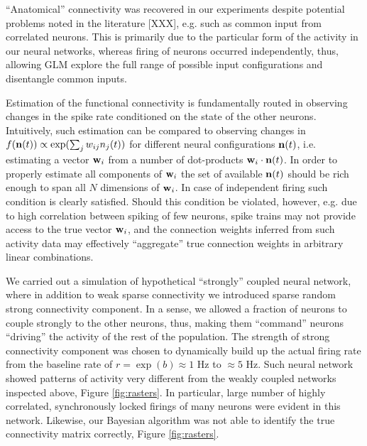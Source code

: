 ``Anatomical'' connectivity was recovered in our experiments despite potential problems noted in the literature [XXX], e.g. such as common input from correlated neurons. This is primarily due to the particular form of the activity in our neural networks, whereas firing of neurons occurred independently, thus, allowing GLM explore the full range of possible input configurations and disentangle common inputs.

Estimation of the functional connectivity is fundamentally routed in observing changes in the spike rate conditioned on the state of the other neurons. Intuitively, such estimation can be compared to observing changes in $f({\bf n}(t))\propto\exp(\sum_j w_{ij}n_j(t))$ for different neural configurations ${\bf n}(t)$, i.e. estimating a vector ${\bf w}_i$ from a number of dot-products ${\bf w}_i\cdot {\bf n}(t)$. In order to properly estimate all components of ${\bf w}_i$ the set of available ${\bf n}(t)$ should be rich enough to span all $N$ dimensions of ${\bf w}_i$. In case of independent firing such condition is clearly satisfied.  Should this condition be violated, however, e.g. due to high correlation between spiking of few neurons, spike trains may not provide access to the true vector ${\bf w}_i$, and the connection weights inferred from such activity data may effectively ``aggregate'' true connection weights in arbitrary linear combinations.

We carried out a simulation of hypothetical ``strongly'' coupled neural network, where in addition to weak sparse connectivity we introduced sparse random strong connectivity component. In a sense, we allowed a fraction of neurons to couple strongly to the other neurons, thus, making them ``command'' neurons ``driving'' the activity of the rest of the population. The strength of strong connectivity component was chosen to dynamically build up the actual firing rate from the baseline rate of $r=\exp(b)\approx 1$ Hz to $\approx 5$ Hz. Such neural network showed patterns of activity very different from the weakly coupled networks inspected above, Figure \ref{fig:rasters}. In particular, large number of highly correlated, synchronously locked firings of many neurons were evident in this network. Likewise, our Bayesian algorithm was not able to identify the true connectivity matrix correctly, Figure \ref{fig:rasters}.

%
%




